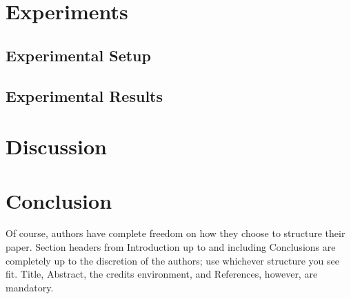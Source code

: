 \documentclass[runningheads]{llncs}
\begin{document}
\section{Experiments}
\subsection{Experimental Setup}
\subsection{Experimental Results}

\section{Discussion}

\section{Conclusion}

Of course, authors have complete freedom on how they choose to structure their paper. Section headers from Introduction up to and including Conclusions are completely up to the discretion of the authors; use whichever structure you see fit. Title, Abstract, the credits environment, and References, however, are mandatory.
\end{document}
